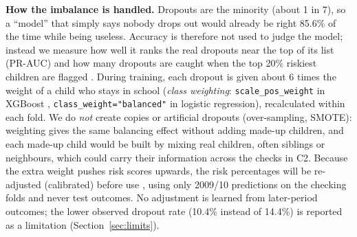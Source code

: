 \documentclass[conference,a4paper]{IEEEtran}
\newcommand{\var}[1]{\texttt{#1}}
\begin{document}
\textbf{How the imbalance is handled.} Dropouts are the minority (about 1 in 7), so a ``model'' that simply says nobody drops out would already be right 85.6\% of the time while being useless. Accuracy is therefore not used to judge the model; instead we measure how well it ranks the real dropouts near the top of its list (PR-AUC) and how many dropouts are caught when the top 20\% riskiest children are flagged \cite{saito2015}. During training, each dropout is given about 6 times the weight of a child who stays in school (\emph{class weighting}: \var{scale\_pos\_weight} in XGBoost \cite{xgboost}, \var{class\_weight="balanced"} in logistic regression), recalculated within each fold. We do \emph{not} create copies or artificial dropouts (over-sampling, SMOTE): weighting gives the same balancing effect without adding made-up children, and each made-up child would be built by mixing real children, often siblings or neighbours, which could carry their information across the checks in C2. Because the extra weight pushes risk scores upwards, the risk percentages will be re-adjusted (calibrated) before use \cite{zadrozny2002}, using only 2009/10 predictions on the checking folds and never test outcomes. No adjustment is learned from later-period outcomes; the lower observed dropout rate (10.4\% instead of 14.4\%) is reported as a limitation (Section~\ref{sec:limits}).

\end{document}
